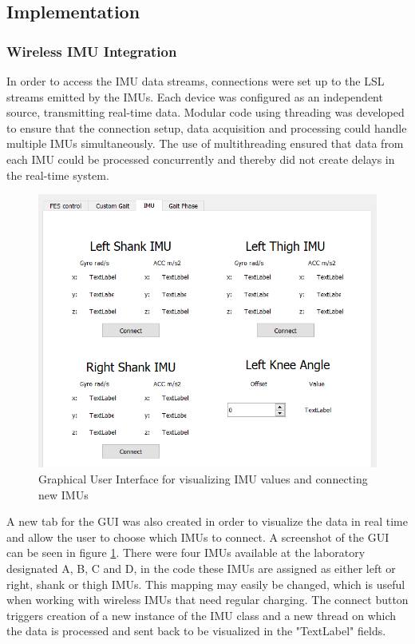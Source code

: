 \subsection{Implementation}
\subsubsection{Wireless IMU Integration}
In order to access the IMU data streams, connections were set up to the LSL streams emitted by the IMUs. Each device was configured as an independent source, transmitting real-time data. Modular code using threading was developed to ensure that the connection setup, data acquisition and processing could handle multiple IMUs simultaneously. The use of multithreading ensured that data from each IMU could be processed concurrently and thereby did not create delays in the real-time system. 

\begin{figure} [h]
    \centering
    \includegraphics[width=0.7\linewidth]{images/imugui1.png}
    \caption{Graphical User Interface for visualizing IMU values and connecting new IMUs}
    \label{fig:imugui}
\end{figure}

A new tab for the GUI was also created in order to visualize the data in real time and allow the user to choose which IMUs to connect. A screenshot of the GUI can be seen in figure \ref{fig:imugui}. There were four IMUs available at the laboratory designated A, B, C and D, in the code these IMUs are assigned as either left or right, shank or thigh IMUs. This mapping may easily be changed, which is useful when working with wireless IMUs that need regular charging. The connect button triggers creation of a new instance of the IMU class and a new thread on which the data is processed and sent back to be visualized in the "TextLabel" fields.

